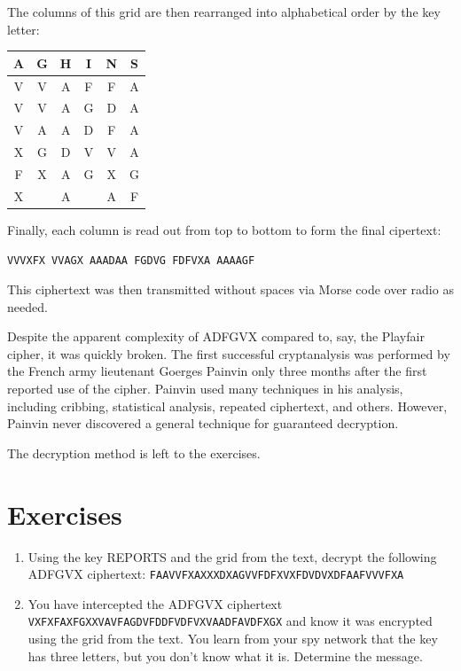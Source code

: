 \documentclass{book}
\theoremstyle{plain}
\theoremstyle{definition}
\newif\ifprintsolutions
\newcommand{\solution}[1]{\ifprintsolutions \begin{sloppypar}{\it #1}\end{sloppypar} \fi} %
\newcommand{\ciphertext}[1]{\texttt{#1}} %
\begin{document}
The columns of this grid are then rearranged into alphabetical order by the key letter:
\begin{center}
\begin{tabular}{cccccc}
A & G & H & I & N & S \\
\hline
V & V & A & F & F & A \\
V & V & A & G & D & A \\
V & A & A & D & F & A \\
X & G & D & V & V & A \\
F & X & A & G & X & G \\
X &   & A &   & A & F
\end{tabular}
\end{center}

Finally, each column is read out from top to bottom to form the final cipertext:
\begin{center}
\ciphertext{VVVXFX VVAGX AAADAA FGDVG FDFVXA AAAAGF}
\end{center}
This ciphertext was then transmitted without spaces via Morse code over radio as needed.

Despite the apparent complexity of ADFGVX compared to, say, the Playfair cipher, it was quickly broken. The first successful cryptanalysis was performed by the French army lieutenant Goerges Painvin only three months after the first reported use of the cipher. Painvin used many techniques in his analysis, including cribbing, statistical analysis, repeated ciphertext, and others. However, Painvin never discovered a general technique for guaranteed decryption.

The decryption method is left to the exercises.

\section{Exercises}
\begin{enumerate}
\item Using the key REPORTS and the grid from the text, decrypt the following ADFGVX ciphertext: \ciphertext{FAAVVFXAXXXDXAGVVFDFXVXFDVDVXDFAAFVVVFXA} \solution{the secret word is bones}
\item You have intercepted the ADFGVX ciphertext \ciphertext{VXFXFAXFGXXVAVFAGDVFDDFVDFVXVAADFAVDFXGX} and know it was encrypted using the grid from the text. You learn from your spy network that the key has three letters, but you don't know what it is. Determine the message. \solution{delta uniform kilo echo}
\end{enumerate}
\end{document}
